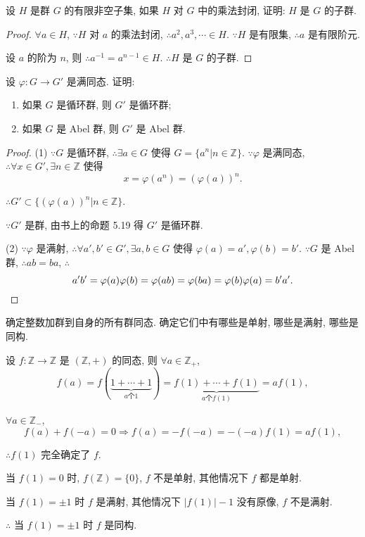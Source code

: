 \documentclass[color=black,device=normal,lang=cn,mode=geye]{elegantnote}
\begin{document}
\begin{exercisec}[5.2.21]
    设 $H$ 是群 $G$ 的有限非空子集, 如果 $H$ 对 $G$ 中的乘法封闭, 证明: $H$ 是 $G$ 的子群.
\end{exercisec}
\begin{proof}
    $\forall a\in H$, $\because H$ 对 $a$ 的乘法封闭, $\therefore a^2,a^3,\cdots\in H$. $\because H$ 是有限集, $\therefore a$ 是有限阶元.
    
    设 $a$ 的阶为 $n$, 则 $\therefore a^{-1}=a^{n-1}\in H$. $\therefore H$ 是 $G$ 的子群.
\end{proof}
\begin{exercisec}[5.2.22]
    设 $\varphi:G\to G'$ 是满同态. 证明:
    \begin{enumerate}
        \def\labelenumi{(\arabic{enumi})}
        \item 如果 $G$ 是循环群, 则 $G'$ 是循环群;
        \item 如果 $G$ 是 Abel 群, 则 $G'$ 是 Abel 群.
    \end{enumerate}
\end{exercisec}
\begin{proof}
    (1) $\because G$ 是循环群, $\therefore\exists a\in G$ 使得 $G=\{a^n|n\in\mathbb{Z}\}$. $\because\varphi$ 是满同态, $\therefore\forall x\in G',\exists n\in\mathbb{Z}$ 使得
    \[x=\varphi(a^n)=(\varphi(a))^n.\]

    $\therefore G'\subset\{(\varphi(a))^n|n\in\mathbb{Z}\}$.

    $\because G'$ 是群, 由书上的命题 5.19 得 $G'$ 是循环群.

    (2) $\because\varphi$ 是满射, $\therefore\forall a',b'\in G',\exists a,b\in G$ 使得 $\varphi(a)=a',\varphi(b)=b'$. $\because G$ 是 Abel 群, $\therefore ab=ba$, $\therefore$
    \[a'b'=\varphi(a)\varphi(b)=\varphi(ab)=\varphi(ba)=\varphi(b)\varphi(a)=b'a'.\qedhere\]
\end{proof}
\begin{exercisec}[5.2.25]
    确定整数加群到自身的所有群同态. 确定它们中有哪些是单射, 哪些是满射, 哪些是同构.
\end{exercisec}
\begin{solution}
    设 $f:\mathbb{Z}\to\mathbb{Z}$ 是 $(\mathbb{Z},+)$ 的同态, 则 $\forall a\in\mathbb{Z}_+$,
    \[f(a)=f(\underbrace{1+\cdots+1}_{a\text{个}1})=\underbrace{f(1)+\cdots+f(1)}_{a\text{个}f(1)}=af(1),\]

    $\forall a\in\mathbb{Z}_-$,
    \[f(a)+f(-a)=0\Rightarrow f(a)=-f(-a)=-(-a)f(1)=af(1),\]

    $\therefore f(1)$ 完全确定了 $f$.

    当 $f(1)=0$ 时, $f(\mathbb{Z})=\{0\}$, $f$ 不是单射, 其他情况下 $f$ 都是单射.

    当 $f(1)=\pm1$ 时 $f$ 是满射, 其他情况下 $|f(1)|-1$ 没有原像, $f$ 不是满射.

    $\therefore$ 当 $f(1)=\pm1$ 时 $f$ 是同构.
\end{solution}
\end{document}
